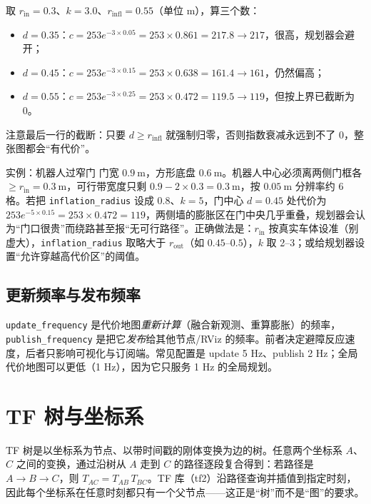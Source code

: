 取 $r_{\mathrm{in}}=0.3$、$k=3.0$、$r_{\mathrm{infl}}=0.55$（单位 m），算三个数：
\begin{itemize}
  \item $d=0.35$：$c=253e^{-3\times0.05}=253\times0.861=217.8\to217$，很高，规划器会避开；
  \item $d=0.45$：$c=253e^{-3\times0.15}=253\times0.638=161.4\to161$，仍然偏高；
  \item $d=0.55$：$c=253e^{-3\times0.25}=253\times0.472=119.5\to119$，但按上界已截断为 0。
\end{itemize}
注意最后一行的截断：只要 $d\ge r_{\mathrm{infl}}$ 就强制归零，否则指数衰减永远到不了 0，整张图都会“有代价”。

\begin{keybox}{实例：机器人过窄门}
门宽 $0.9\ \mathrm{m}$，方形底盘 $0.6\ \mathrm{m}$。机器人中心必须离两侧门框各 $\ge r_{\mathrm{in}}=0.3\ \mathrm{m}$，可行带宽度只剩 $0.9-2\times0.3=0.3\ \mathrm{m}$，按 $0.05\ \mathrm{m}$ 分辨率约 6 格。若把 \texttt{inflation\_radius} 设成 $0.8$、$k=5$，门中心 $d=0.45$ 处代价为 $253e^{-5\times0.15}=253\times0.472=119$，两侧墙的膨胀区在门中央几乎重叠，规划器会认为“门口很贵”而绕路甚至报“无可行路径”。正确做法是：$r_{\mathrm{in}}$ 按真实车体设准（别虚大），\texttt{inflation\_radius} 取略大于 $r_{\mathrm{out}}$（如 $0.45$--$0.5$），$k$ 取 2--3；或给规划器设置“允许穿越高代价区”的阈值。
\end{keybox}

\subsection{更新频率与发布频率}

\texttt{update\_frequency} 是代价地图\emph{重新计算}（融合新观测、重算膨胀）的频率，\texttt{publish\_frequency} 是把它\emph{发布}给其他节点/RViz 的频率。前者决定避障反应速度，后者只影响可视化与订阅端。常见配置是 update 5 Hz、publish 2 Hz；全局代价地图可以更低（1 Hz），因为它只服务 1 Hz 的全局规划。

\section{TF 树与坐标系}\label{sec:18-tf}

\begin{definition}[TF 树]
TF 树是以坐标系为节点、以带时间戳的刚体变换为边的树。任意两个坐标系 $A$、$C$ 之间的变换，通过沿树从 $A$ 走到 $C$ 的路径逐段复合得到：若路径是 $A\to B\to C$，则 $T_{AC}=T_{AB}\,T_{BC}$。TF 库（tf2）沿路径查询并插值到指定时刻，因此每个坐标系在任意时刻都只有一个父节点——这正是“树”而不是“图”的要求。
\end{definition}

